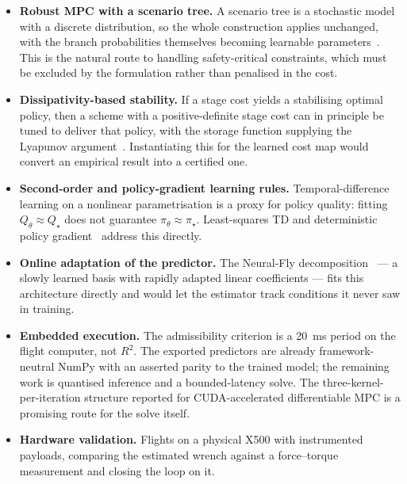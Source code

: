 \documentclass[11pt,a4paper,twoside,openright]{report}
\makeatletter
\renewcommand{\subsection}{\FloatBarrier\old@subsection}}
\theoremstyle{plain}
\theoremstyle{definition}
\theoremstyle{remark}
\makeatother
\begin{document}
	\begin{itemize}[leftmargin=*]
		\item \textbf{Robust MPC with a scenario tree.} A scenario tree is a stochastic
		model with a discrete distribution, so the whole construction applies
		unchanged, with the branch probabilities themselves becoming learnable
		parameters~\cite{gros2020data}. This is the natural route to handling
		safety-critical constraints, which must be excluded by the formulation rather
		than penalised in the cost.
		\item \textbf{Dissipativity-based stability.} If a stage cost yields a
		stabilising optimal policy, then a scheme with a positive-definite stage cost
		can in principle be tuned to deliver that policy, with the storage function
		supplying the Lyapunov argument~\cite{diehl2011lyapunov,muller2015necessity}.
		Instantiating this for the learned cost map would convert an empirical result
		into a certified one.
		\item \textbf{Second-order and policy-gradient learning rules.} Temporal-difference
		learning on a nonlinear parametrisation is a proxy for policy quality: fitting
		$Q_\theta\approx Q_\star$ does not guarantee $\pi_\theta\approx\pi_\star$.
		Least-squares TD and deterministic policy gradient~\cite{silver2014dpg}
		address this directly.
	\end{itemize}

	\subsection{Longer term --- deployment}

	\begin{itemize}[leftmargin=*]
		\item \textbf{Online adaptation of the predictor.} The Neural-Fly
		decomposition~\cite{oconnell2022neuralfly} --- a slowly learned basis with
		rapidly adapted linear coefficients --- fits this architecture directly and
		would let the estimator track conditions it never saw in training.
		\item \textbf{Embedded execution.} The admissibility criterion is a
		\SI{20}{\milli\second} period on the flight computer, not $R^2$. The exported
		predictors are already framework-neutral NumPy with an asserted parity to the
		trained model; the remaining work is quantised inference and a
		bounded-latency solve. The three-kernel-per-iteration structure reported for
		CUDA-accelerated differentiable MPC is a promising route for the solve itself.
		\item \textbf{Hardware validation.} Flights on a physical X500 with instrumented
		payloads, comparing the estimated wrench against a force--torque measurement
		and closing the loop on it.
	\end{itemize}
\end{document}
